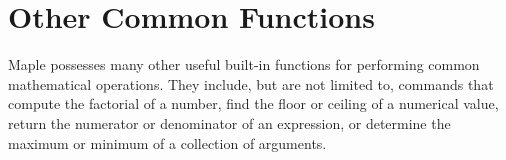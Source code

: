 \begin{multicols}{3}	
\begin{mapleinput}  \end{mapleinput}
\begin{mapleinput}  \end{mapleinput}
\begin{mapleinput}  \end{mapleinput}
\begin{mapleinput}  \end{mapleinput}
\begin{mapleinput}  \end{mapleinput}
\begin{mapleinput}  \end{mapleinput}
\begin{mapleinput}  \end{mapleinput}
\begin{mapleinput}  \end{mapleinput}
\begin{mapleinput}  \end{mapleinput}
\begin{mapleinput}  \end{mapleinput}
\begin{mapleinput}  \end{mapleinput}
\begin{mapleinput}  \end{mapleinput}
\vfill\null
\end{multicols}

\section{Other Common Functions}
\label{sec:other_common_functions}

Maple possesses many other useful built-in functions for performing common mathematical operations. They include, but are not limited to, commands that compute the factorial of a number, find the floor or ceiling of a numerical value, return the numerator or denominator of an expression, or determine the maximum or minimum of a collection of arguments.

